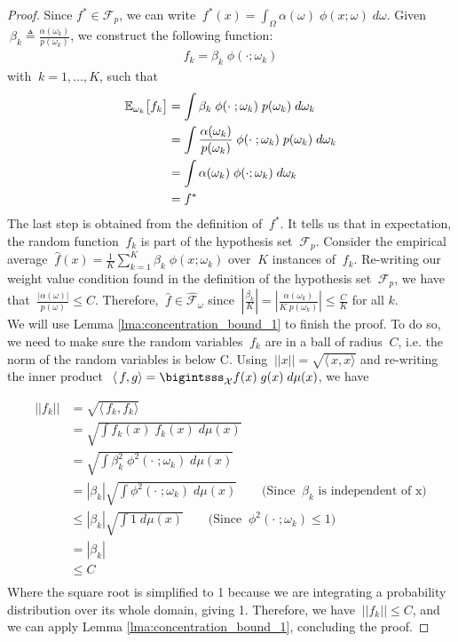 \documentclass{article}
\begin{document}
\begin{proof}
   Since $f^* \in \mathcal{F}_p$, we can write $\ f^*(x) = \int_\Omega \alpha(\omega)\;\phi(x;\omega) \;d\omega$. Given $\ \beta_k \triangleq \frac{\alpha(\omega_k)}{p(\omega_k)}$, we construct the following function:
    \begin{align*}
        f_k = \beta_k\;\phi(\cdot;\omega_k)
    \end{align*}
    with $\ k = 1, \dots, K$, such that
    \begin{align*}
        \mathbb{E}_{\omega_k}\big[f_k\big] &= \int \beta_k\;\phi(\cdot\;;\omega_k)\;p(\omega_k) \;d\omega_k \\
        &= \int \frac{\alpha(\omega_k)}{p(\omega_k)}\;\phi(\cdot\;;\omega_k)
        \;p(\omega_k) \;d\omega_k \\
        &= \int \alpha(\omega_k)\;\phi(\cdot;\omega_k)\; d\omega_k \\
        &= f^*
    \end{align*}
    The last step is obtained from the definition of $\ f^*$. It tells us that in expectation, the random function $\ f_k$ is part of the hypothesis set $\ \mathcal{F}_p$. Consider the empirical average $\ \hat{f}(x) = \frac{1}{K}\sum\limits_{k=1}^K \beta_k\;\phi(x;\omega_k)$ over $\ K$ instances of $\ f_k$. Re-writing our weight value condition found in the definition of the hypothesis set $\ \mathcal{F}_p$, we have that $\ \frac{|\alpha(\omega)|}{p(\omega)} \leq C$. Therefore, $\ \hat{f} \in \mathcal{\hat{F}_{\omega}}$ since $\ |\frac{\beta_k}{K}| = |\frac{\alpha(\omega_k)}{K\;p(\omega_k)}| \leq \frac{C}{K}$ for all $k$.\\

    We will use Lemma \ref{lma:concentration_bound_1} to finish the proof. To do so, we need to make sure the random variables $\ f_k$ are in a ball of radius $\ C$, i.e. the norm of the random variables is below C. Using $\ ||x|| = \sqrt{\langle\,x,x\rangle}$ and re-writing the inner product $\ \langle\,f,g\rangle = \bigintsss_{\mathcal{X}} f(x)\;g(x)\; d\mu(x)$, we have

    \begin{align*}
        ||f_k|| &= \sqrt{\langle\,f_k,f_k\rangle} \\
        &= \sqrt{\int f_k(x)\;f_k(x) \;d\mu(x)} \\
        &= \sqrt{\int \beta_k^2\;\phi^2(\cdot\;;\omega_k) \;d\mu(x)} \\
        &= |\beta_k| \sqrt{\int \phi^2(\cdot\;;\omega_k) \;d\mu(x)} \quad \quad \text{(Since $\ \beta_k$ is independent of x)} \\
        &\leq |\beta_k| \sqrt{\int 1 \;d\mu(x)} \quad \quad \text{(Since $\ \phi^2(\cdot\;;\omega_k) \leq 1$)} \\
        &= |\beta_k| \\
        &\leq C \\
    \end{align*}
    Where the square root is simplified to 1 because we are integrating a probability distribution over its whole domain, giving 1. Therefore, we have $\ ||f_k|| \leq C$, and we can apply Lemma \ref{lma:concentration_bound_1}, concluding the proof.

\end{proof}
\end{document}
